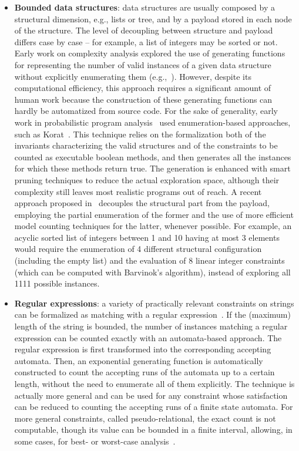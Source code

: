 \begin{itemize}
	\item \textbf{Bounded data structures}: data structures are usually composed by a structural dimension, e.g., lists or tree, and by a payload stored in each node of the structure. The level of decoupling between structure and payload differs case by case -- for example, a list of integers may be sorted or not. Early work on complexity analysis explored the use of generating functions for representing the number of valid instances of a given data structure without explicitly enumerating them (e.g.,~\cite{flajolet1985mathematical}). However, despite its computational efficiency, this approach requires a significant amount of human work because the construction of these generating functions can hardly be automatized from source code. For the sake of generality, early work in probabilistic program analysis~\cite{Filieri2013} used enumeration-based approaches, such as Korat~\cite{Korat2002}. This technique relies on the formalization both of the invariants characterizing the valid structures and of the constraints to be counted as executable boolean methods, and then generates all the instances for which these methods return true. The generation is enhanced with smart pruning techniques to reduce the actual exploration space, although their complexity still leaves most realistic programs out of reach. A recent approach proposed in~\cite{Filieri2015} decouples the structural part from the payload, employing the partial enumeration of the former and the use of more efficient model counting techniques for the latter, whenever possible. For example, an acyclic sorted list of integers between 1 and 10 having at most 3 elements would require the enumeration of 4 different structural configuration (including the empty list) and the evaluation of 8 linear integer constraints (which can be computed with Barvinok's algorithm), instead of exploring all 1111 possible instances.

	\item \textbf{Regular expressions}: a variety of practically relevant constraints on strings can be formalized as matching with a regular expression~\cite{Luu2014,Aydin2015}. If the (maximum) length of the string is bounded, the number of instances matching a regular expression can be counted exactly with an automata-based approach. The regular expression is first transformed into the corresponding accepting automata. Then, an exponential generating function is automatically constructed to count the accepting runs of the automata up to a certain length, without the need to enumerate all of them explicitly. The technique is actually more general and can be used for any constraint whose satisfaction can be reduced to counting the accepting runs of a finite state automata. For more general constraints, called pseudo-relational, the exact count is not computable, though its value can be bounded in a finite interval, allowing, in some cases, for best- or worst-case analysis~\cite{Aydin2015}.
	

\end{itemize}
